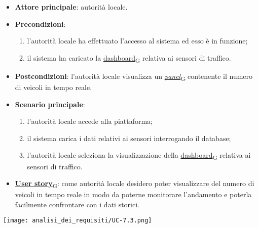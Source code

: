 \begin{itemize}
	\item \textbf{Attore principale}: autorità locale.
	\item \textbf{Precondizioni}:
	      \begin{enumerate}
		      \item l'autorità locale ha effettuato l'accesso al sistema ed esso è in funzione;
		      \item il sistema ha caricato la \href{https://7last.github.io/docs/rtb/documentazione-interna/glossario\#dashboard}{dashboard\textsubscript{G}} relativa ai sensori di traffico.
	      \end{enumerate}
	\item \textbf{Postcondizioni}: l'autorità locale visualizza un \href{https://7last.github.io/docs/rtb/documentazione-interna/glossario\#panel}{\textit{panel}\textsubscript{G}} contenente il numero di veicoli in tempo reale.
	\item \textbf{Scenario principale}:
	      \begin{enumerate}
		      \item l'autorità locale accede alla piattaforma;
		      \item il sistema carica i dati relativi ai sensori interrogando il database;
		      \item l'autorità locale seleziona la visualizzazione della \href{https://7last.github.io/docs/rtb/documentazione-interna/glossario\#dashboard}{dashboard\textsubscript{G}} relativa ai sensori di traffico.
	      \end{enumerate}
	\item \href{https://7last.github.io/docs/rtb/documentazione-interna/glossario\#user-story}{\textbf{User story}\textsubscript{G}}:
	      come autorità locale desidero poter visualizzare del numero di veicoli in tempo reale in modo da poterne monitorare l'andamento
	      e poterla facilmente confrontare con i dati storici.
\end{itemize}
\begin{center}
	\texttt{[image: analisi\_dei\_requisiti/UC-7.3.png]}
\end{center}

\newpage

